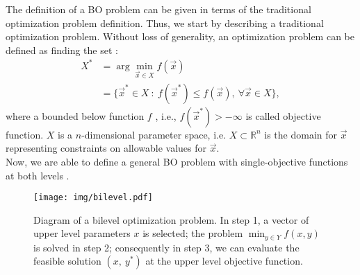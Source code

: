 \documentclass[conference]{IEEEtran}
\theoremstyle{definition}
\begin{document}
The definition of a BO problem can be given in terms of the traditional
optimization problem definition. Thus, we start by describing a traditional optimization
problem. Without loss of generality, an optimization problem can be defined as
finding the set \cite{chong2013introduction,rao2009engineering}:
% 
\begin{align}
    \label{eqn:Xargmin}
    X^* &= \arg \min_{\vec{x} \in X} f(\vec{x}) \\ \nonumber
    &= \{ \vec{x}^* \in X \ : \ f(\vec{x}^*) \leq f( \vec{x} ), \ 
    \forall
    \vec{x} \in X \},
\end{align}
% 
where a bounded below function $f$ , i.e., $f(\vec{x}^*)> -\infty$ is called objective
function. $X$ is a $n$-dimensional parameter space, i.e. $X \subset \mathbb{R}^n$
is the domain for $\vec{x}$ representing constraints on
allowable values for $\vec{x}$.\\

Now, we are able to define a general BO problem with
single-objective functions at both levels
\cite{bard2013practical,dempe2002foundations}.

\begin{figure}[t]
    \centering
    \texttt{[image: img/bilevel.pdf]}
    \caption{ Diagram of a bilevel optimization problem. In step 1, a vector of %
              upper level parameters $x$ is selected; the problem $\min_{y\in Y} %
              f(x, y)$ is solved in step 2; consequently in step 3, we can evaluate %
              the feasible solution $(x,\ y^*)$ at the upper level objective function. %
            }
    \label{fig:bilevel}
\end{figure}
% 
\end{document}
